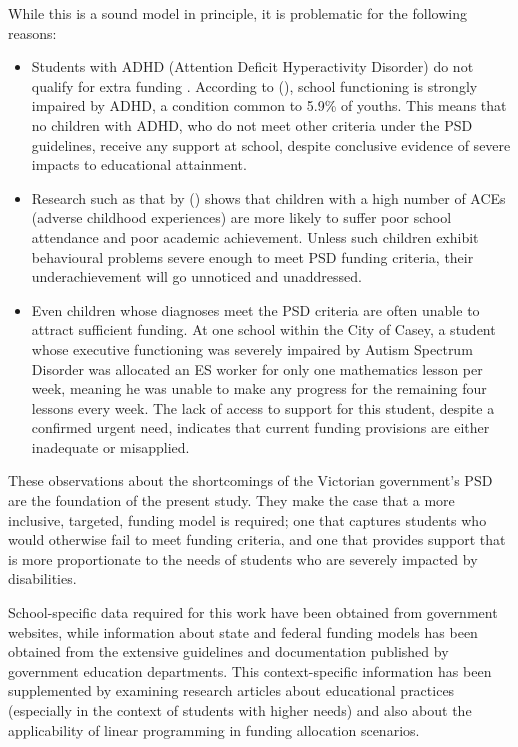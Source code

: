\documentclass[11pt, a4paper]{article}
\begin{document}
    While this is a sound model in principle, it is problematic for the following reasons:

    \begin{itemize}
        \item Students with ADHD (Attention Deficit Hyperactivity Disorder) do not qualify for extra funding \parencite{psd_guidelines}. According to  (), school functioning is strongly impaired by ADHD, a condition common to 5.9\% of youths. This means that no children with ADHD, who do not meet other criteria under the PSD guidelines, receive any support at school, despite conclusive evidence of severe impacts to educational attainment.
        \item Research such as that by  () shows that children with a high number of ACEs (adverse childhood experiences) are more likely to suffer poor school attendance and poor academic achievement. Unless such children exhibit behavioural problems severe enough to meet PSD funding criteria, their underachievement will go unnoticed and unaddressed.
        \item Even children whose diagnoses meet the PSD criteria are often unable to attract sufficient funding. At one school within the City of Casey, a student whose executive functioning was severely impaired by Autism Spectrum Disorder was allocated an ES worker for only one mathematics lesson per week, meaning he was unable to make any progress for the remaining four lessons every week. The lack of access to support for this student, despite a confirmed urgent need, indicates that current funding provisions are either inadequate or misapplied.
    \end{itemize}

    These observations about the shortcomings of the Victorian government's PSD are the foundation of the present study. They make the case that a more inclusive, targeted, funding model is required; one that captures students who would otherwise fail to meet funding criteria, and one that provides support that is more proportionate to the needs of students who are severely impacted by disabilities.

    School-specific data required for this work have been obtained from government websites, while information about state and federal funding models has been obtained from the extensive guidelines and documentation published by government education departments. This context-specific information has been supplemented by examining research articles about educational practices (especially in the context of students with higher needs) and also about the applicability of linear programming in funding allocation scenarios.
\end{document}

